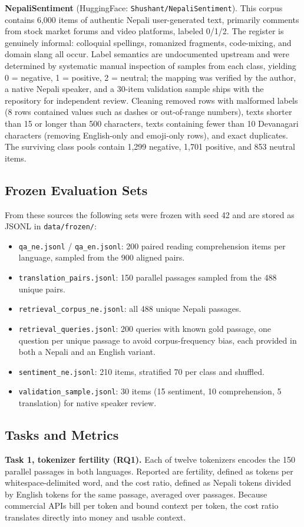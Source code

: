\documentclass[conference]{IEEEtran}
\begin{document}
\textbf{NepaliSentiment} (HuggingFace: \texttt{Shushant/NepaliSentiment}). This corpus contains 6{,}000 items of authentic Nepali user-generated text, primarily comments from stock market forums and video platforms, labeled 0/1/2. The register is genuinely informal: colloquial spellings, romanized fragments, code-mixing, and domain slang all occur. Label semantics are undocumented upstream and were determined by systematic manual inspection of samples from each class, yielding 0 = negative, 1 = positive, 2 = neutral; the mapping was verified by the author, a native Nepali speaker, and a 30-item validation sample ships with the repository for independent review. Cleaning removed rows with malformed labels (8 rows contained values such as dashes or out-of-range numbers), texts shorter than 15 or longer than 500 characters, texts containing fewer than 10 Devanagari characters (removing English-only and emoji-only rows), and exact duplicates. The surviving class pools contain 1{,}299 negative, 1{,}701 positive, and 853 neutral items.

\subsection{Frozen Evaluation Sets}
From these sources the following sets were frozen with seed 42 and are stored as JSONL in \texttt{data/frozen/}:
\begin{itemize}
\item \texttt{qa\_ne.jsonl} / \texttt{qa\_en.jsonl}: 200 paired reading comprehension items per language, sampled from the 900 aligned pairs.
\item \texttt{translation\_pairs.jsonl}: 150 parallel passages sampled from the 488 unique pairs.
\item \texttt{retrieval\_corpus\_ne.jsonl}: all 488 unique Nepali passages.
\item \texttt{retrieval\_queries.jsonl}: 200 queries with known gold passage, one question per unique passage to avoid corpus-frequency bias, each provided in both a Nepali and an English variant.
\item \texttt{sentiment\_ne.jsonl}: 210 items, stratified 70 per class and shuffled.
\item \texttt{validation\_sample.jsonl}: 30 items (15 sentiment, 10 comprehension, 5 translation) for native speaker review.
\end{itemize}

\subsection{Tasks and Metrics}
\textbf{Task 1, tokenizer fertility (RQ1).} Each of twelve tokenizers encodes the 150 parallel passages in both languages. Reported are fertility, defined as tokens per whitespace-delimited word, and the cost ratio, defined as Nepali tokens divided by English tokens for the same passage, averaged over passages. Because commercial APIs bill per token and bound context per token, the cost ratio translates directly into money and usable context.
\end{document}
